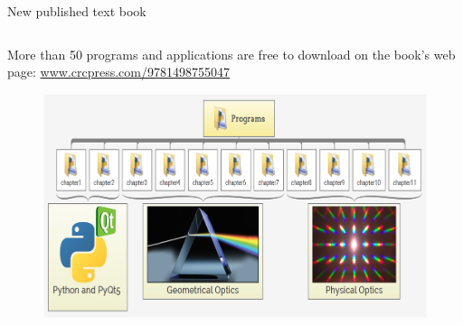 \documentclass[serif ,mathserif, 8pt]{beamer}
\begin{document}
\begin{frame}{New published text book}
\begin{columns}[c]
	\begin{column}{0.6\textwidth}
		More than 50 programs and applications are free to download on the book's web page: \url{www.crcpress.com/9781498755047}
		
		\begin{figure}
			\includegraphics[width=\linewidth]{images/Image4}
			
		\end{figure}
		

\end{column}
\end{columns}
\end{frame}
\end{document}
